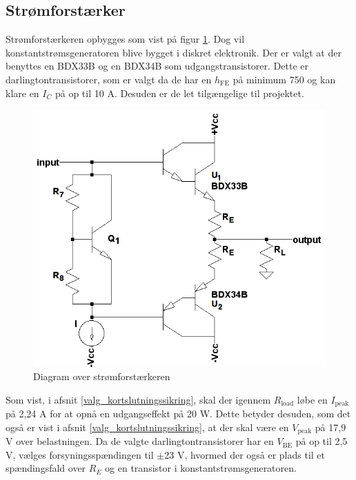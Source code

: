 \subsection{Strømforstærker}
\label{effekt_stroemforstaerker}
Strømforstærkeren opbygges som vist på figur \ref{fig:blokdiagram-stroem}. Dog vil konstantstrømsgeneratoren blive bygget i diskret elektronik. Der er valgt at der benyttes en BDX33B og en BDX34B \cite{bdx33-34-datablad} som udgangstransistorer. Dette er darlingtontransistorer, som er valgt da de har en $h_{\mathrm{FE}}$ på minimum 750 og kan klare en $I_C$ på op til 10 A. Desuden er de let tilgængelige til projektet.

\begin{figure}[h]
\centering
\includegraphics[scale=0.4]{teknisk/effektforstaerker/blokdiagram-stroemforstaerker.png}
\caption{Diagram over strømforstærkeren}
\label{fig:blokdiagram-stroem}
\end{figure}

Som vist, i afsnit \ref{valg_kortslutningssikring}, skal der igennem $R_{\mathrm{load}}$ løbe en $I_{\mathrm{peak}}$ på 2,24 A for at opnå en udgangseffekt på 20 W. Dette betyder desuden, som det også er vist i afsnit \ref{valg_kortslutningssikring}, at der skal være en $V_{\mathrm{peak}}$ på 17,9 V over belastningen. Da de valgte darlingtontransistorer har en $V_{\mathrm{BE}}$ på op til 2,5 V, vælges forsyningsspændingen til $\pm$23 V, hvormed der også er plads til et spændingsfald over $R_E$ og en transistor i konstantstrømsgeneratoren.

